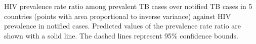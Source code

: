 \label{fig:hivratio}HIV prevalence rate ratio among prevalent TB cases over notified TB cases in 5 countries (points with area proportional to inverse variance) against HIV prevalence in notified cases. Predicted values of the prevalence rate ratio are shown with a solid line. The dashed lines represent 95\% confidence bounds.